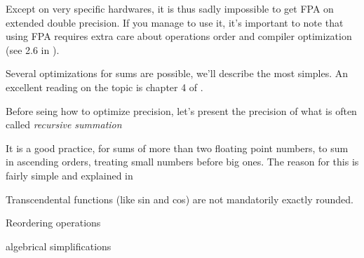 
Except on very specific hardwares, it is thus sadly impossible to get FPA on extended double precision. If you manage to use it, it's important to note that using FPA requires extra care about operations order and compiler optimization (see 2.6 in \cite{Higham}).


Several optimizations for sums are possible, we'll describe the most simples. An excellent reading on the topic is chapter 4 of \cite{Higham}.


Before seing how to optimize precision, let's present the precision of what is often called \emph{recursive summation}


It is a good practice, for sums of more than two floating point numbers, to sum in ascending orders, treating small numbers before big ones. The reason for this is fairly simple and explained in 



\cite{Langlois} %




Transcendental functions (like sin and cos) are not mandatorily exactly rounded.



Reordering operations

algebrical simplifications








